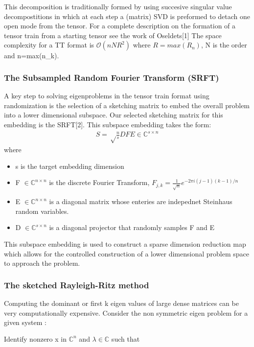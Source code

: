 \documentclass[%
 aip,12pt
 amsmath,amssymb,
 reprint,%
]{revtex4-1}
\begin{document}
This decomposition is traditionally formed by using succesive singular value decompostitions in which at each step a (matrix) SVD is preformed to detach one open mode from the tensor. For a complete description on the formation of a tensor train from a starting tensor see the work of Oseldets[1]
The space complexity for a TT format is $\mathcal{O}(nNR^2)$ where $R=max(R_n)$, N is the order and  n=max(n_k).\\

\subsubsection{\label{sec:level3}The Subsampled Random Fourier Transform (SRFT)}
A key step to solving eigenproblems in the tensor train format using randomization is the selection of a sketching matrix to embed the overall problem into a lower dimensional subspace. Our selected sketching matrix for this embedding is the SRFT[2]. This subspace embedding takes the form:
\begin{eqnarray}
  S=\sqrt\frac{n}{s} DFE \in \mathbb{C}^{s\times n}
  \label{eq:two}
\end{eqnarray}
where
\begin{itemize}
  \item s is the target embedding dimension
  \item F $\in \mathbb{C}^{n \times n}$ is the discrete Fourier Transform, $F_{j,k}=\frac{1}{\sqrt{n}}e^{-2\pi i(j-1)(k-1)/n}$
  \item E $\in \mathbb{C}^{n \times n}$ is a diagonal matrix whose enteries are indepednet Steinhaus random variables.
  \item D $\in \mathbb{C}^{s \times n}$ is a diagonal projector that randomly samples F and E

\end{itemize}
This subspace embedding is used to construct a sparse dimension reduction map which allows for the controlled construction of a lower dimensional problem space to approach the problem.
\subsubsection{\label{sec:level3}The sketched Rayleigh-Ritz method }
Computing the dominant or first k eigen values of large dense matrices can be very computationally expensive.
Consider the non symmetric eigen problem for a given system :

Identify nonzero x in $\mathbb{C}^n$ and $\lambda \in \mathbb{C}$ such that\\
\end{document}
